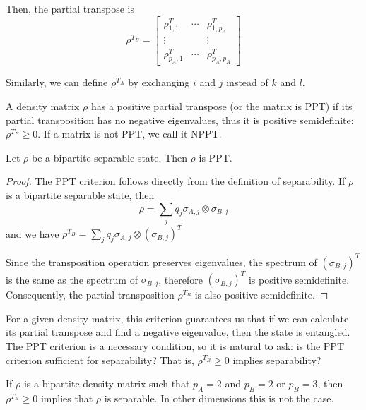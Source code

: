 Then, the partial transpose is
\begin{equation}
    \rho^{T_B} = \begin{bmatrix}
        \rho_{1,1}^T& \cdots & \rho_{1,p_A}^T\\
        \vdots & & \vdots\\
        \rho_{p_A,1}^T & \cdots & \rho_{p_A,p_A}^T
        \end{bmatrix} 
\end{equation}

Similarly, we can define $\rho^{T_A}$ by exchanging $i$ and $j$ instead of $k$ and $l$. 

A density matrix $\rho$ has a positive partial transpose (or the matrix is PPT) if its partial transposition has no negative eigenvalues, thus it is positive semidefinite: $\rho^{T_B}\geq 0$. If a matrix is not PPT, we call it NPPT. 

\begin{teorema}
    Let $\rho$ be a bipartite separable state. Then $\rho$ is PPT. 
\end{teorema}
\begin{proof}
    The PPT criterion follows directly from the definition of separability. If $\rho$ is a bipartite separable state, then 
    \begin{equation}
        \rho = \sum_{j}q_j \sigma_{A,j} \otimes \sigma_{B,j} 
    \end{equation}
    and we have $\rho^{T_B} = \sum_j q_j \sigma_{A,j} \otimes (\sigma_{B,j})^T$

    Since the transposition operation preserves eigenvalues, the spectrum of $(\sigma_{B,j})^T$ is the same as the spectrum of $\sigma_{B,j}$, therefore $(\sigma_{B,j})^T$ is positive semidefinite.  Consequently, the partial transposition $\rho^{T_B}$ is also positive semidefinite.
\end{proof}

For a given density matrix, this criterion guarantees us that if we can calculate its partial transpose and find a negative eigenvalue, then the state is entangled. The PPT criterion is a necessary condition, so it is natural to ask: is the PPT criterion sufficient for separability? That is, $\rho^{T_B} \geq 0$ implies separability?

\begin{teorema}
    If $\rho$ is a bipartite density matrix such that $p_A=2$ and $p_B = 2$ or $p_B=3$, then $\rho^{T_B} \geq 0$ implies that $\rho$ is separable. In other dimensions this is not the case.
\end{teorema}


